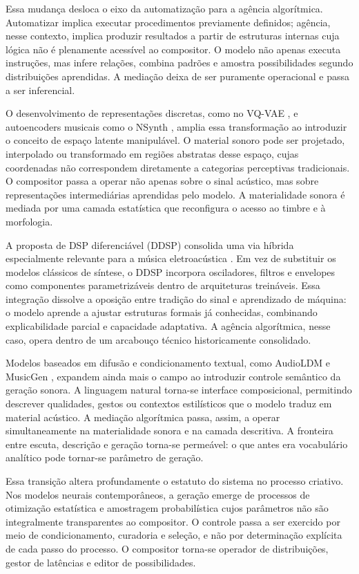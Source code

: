 Essa mudança desloca o eixo da automatização para a agência algorítmica. Automatizar implica executar procedimentos previamente definidos; agência, nesse contexto, implica produzir resultados a partir de estruturas internas cuja lógica não é plenamente acessível ao compositor. O modelo não apenas executa instruções, mas infere relações, combina padrões e amostra possibilidades segundo distribuições aprendidas. A mediação deixa de ser puramente operacional e passa a ser inferencial.

O desenvolvimento de representações discretas, como no VQ-VAE \cite{oord2017vqvae}, e autoencoders musicais como o NSynth \cite{engel2017nsynth}, amplia essa transformação ao introduzir o conceito de espaço latente manipulável. O material sonoro pode ser projetado, interpolado ou transformado em regiões abstratas desse espaço, cujas coordenadas não correspondem diretamente a categorias perceptivas tradicionais. O compositor passa a operar não apenas sobre o sinal acústico, mas sobre representações intermediárias aprendidas pelo modelo. A materialidade sonora é mediada por uma camada estatística que reconfigura o acesso ao timbre e à morfologia.

A proposta de DSP diferenciável (DDSP) consolida uma via híbrida especialmente relevante para a música eletroacústica \cite{engel2020ddsp}. Em vez de substituir os modelos clássicos de síntese, o DDSP incorpora osciladores, filtros e envelopes como componentes parametrizáveis dentro de arquiteturas treináveis. Essa integração dissolve a oposição entre tradição do sinal e aprendizado de máquina: o modelo aprende a ajustar estruturas formais já conhecidas, combinando explicabilidade parcial e capacidade adaptativa. A agência algorítmica, nesse caso, opera dentro de um arcabouço técnico historicamente consolidado.

Modelos baseados em difusão e condicionamento textual, como AudioLDM \cite{liu2023audioldm} e MusicGen \cite{copet2023musicgen}, expandem ainda mais o campo ao introduzir controle semântico da geração sonora. A linguagem natural torna-se interface composicional, permitindo descrever qualidades, gestos ou contextos estilísticos que o modelo traduz em material acústico. A mediação algorítmica passa, assim, a operar simultaneamente na materialidade sonora e na camada descritiva. A fronteira entre escuta, descrição e geração torna-se permeável: o que antes era vocabulário analítico pode tornar-se parâmetro de geração.

Essa transição altera profundamente o estatuto do sistema no processo criativo. Nos modelos neurais contemporâneos, a geração emerge de processos de otimização estatística e amostragem probabilística cujos parâmetros não são integralmente transparentes ao compositor. O controle passa a ser exercido por meio de condicionamento, curadoria e seleção, e não por determinação explícita de cada passo do processo. O compositor torna-se operador de distribuições, gestor de latências e editor de possibilidades.

